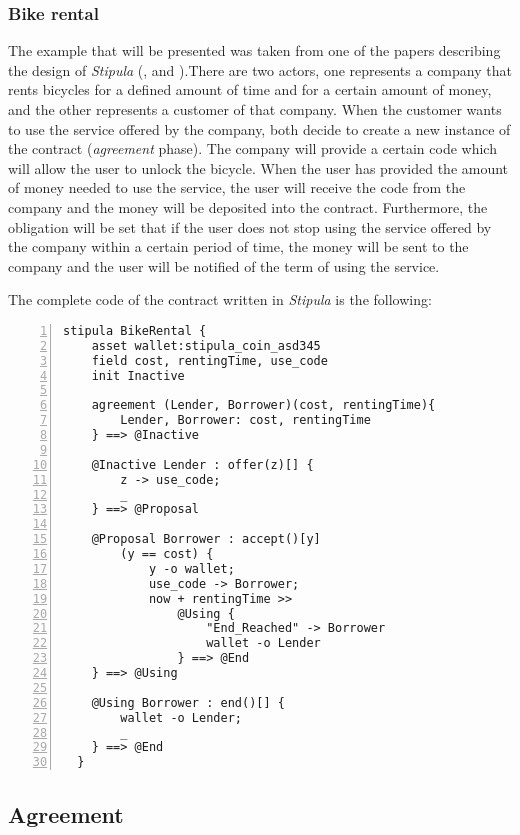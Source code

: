 \subsubsection{Bike rental}
\label{bike-rental-example-definition}

The example that will be presented was taken from one of the papers describing the design of 
\textit{Stipula} (\cite{article:pacta-sunt-servanda}, \cite{article:stipula-dsl} and 
\cite{article:stipula-legal-calculi}).There are two actors, one represents a company that rents bicycles 
for a defined amount of time and for a certain amount of money, and the other represents a customer of that 
company. When the customer wants to use the service offered by the company, both decide to create a new 
instance of the contract (\textit{agreement} phase). The company will provide a certain code which will 
allow the user to unlock the bicycle. When the user has provided the amount of money needed to use the 
service, the user will receive the code from the company and the money will be deposited into the 
contract. Furthermore, the obligation will be set that if the user does not stop using the service offered 
by the company within a certain period of time, the money will be sent to the company and the user will 
be notified of the term of using the service.

The complete code of the contract written in \textit{Stipula} is the following:
\begin{Verbatim}[numbers=left,xleftmargin=1cm,firstnumber=1,tabsize=2]
  stipula BikeRental {
    asset wallet:stipula_coin_asd345
    field cost, rentingTime, use_code
    init Inactive

    agreement (Lender, Borrower)(cost, rentingTime){
        Lender, Borrower: cost, rentingTime
    } ==> @Inactive

    @Inactive Lender : offer(z)[] {
        z -> use_code;
        _
    } ==> @Proposal

    @Proposal Borrower : accept()[y]
        (y == cost) {
            y -o wallet;
            use_code -> Borrower;
            now + rentingTime >>
                @Using {
                    "End_Reached" -> Borrower
                    wallet -o Lender
                } ==> @End
    } ==> @Using

    @Using Borrower : end()[] {
        wallet -o Lender;
        _
    } ==> @End
  }
\end{Verbatim}

\subsection{Agreement}

